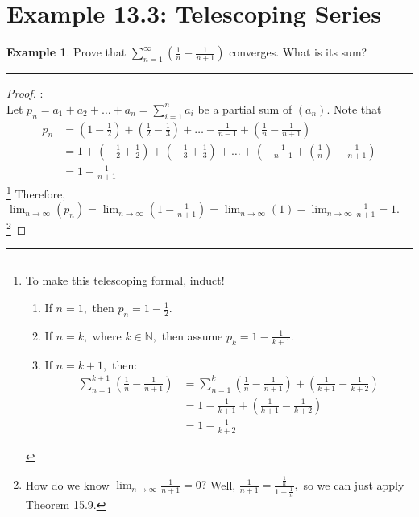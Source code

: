 \documentclass[openany, amssymb, psamsfonts]{amsart}
\newcommand{\bbN}{\mathbb{N}}
\theoremstyle{definition}
\newtheorem{exmp}{Example}[section]
\numberwithin{equation}{section}
\begin{document}
\section*{Example 13.3: Telescoping Series}
\begin{exmp}
\label{16.3}
	Prove that $\displaystyle \sum\limits_{n = 1}^{\infty} \left(\frac{1}{n} - \frac{1}{n + 1}\right)$ converges. What is its sum?
\end{exmp}
\vspace{4pt}     \hrule   \vspace{4pt} \begin{proof}:\\
Let $p_n = a_1 + a_2 + \dots + a_n = \sum_{i=1}^na_i$ be a partial sum of $(a_n).$ Note that 
\begin{align*}
p_n &= (1 - \frac{1}{2}) + (\frac{1}{2} - \frac{1}{3}) + \dots - \frac{1}{n-1}+(\frac{1}{n} - \frac{1}{n+1})\\
&= 1 + (-\frac{1}{2} + \frac{1}{2}) + (-\frac{1}{3} + \frac{1}{3}) + \dots  + (-\frac{1}{n-1}+(\frac{1}{n}) - \frac{1}{n+1})\\
&= 1 - \frac{1}{n+1}
\end{align*}\footnote{To make this telescoping formal, induct!
\begin{enumerate}
\item If $n = 1,$ then $p_n = 1 - \frac{1}{2}.$
\item If $n = k,$ where $k\in \bbN,$ then assume $p_k = 1 - \frac{1}{k+1}.$
\item If $n = k+1,$ then:
\begin{align*}
\displaystyle\sum_{n = 1}^{k+1} (\frac{1}{n} - \frac{1}{n+1})&= \displaystyle\sum_{n=1}^k(\frac{1}{n} - \frac{1}{n+1}) + (\frac{1}{k+1} - \frac{1}{k+2})\\
\tag{Ind. Hypothesis}&=  1 - \frac{1}{k+1} + (\frac{1}{k+1} - \frac{1}{k+2})\\
&= 1 - \frac{1}{k+2}
\end{align*}
\end{enumerate}
} Therefore, $\displaystyle\lim_{n\to \infty}(p_n) = \displaystyle\lim_{n\to \infty}(1-\frac{1}{n+1}) = \displaystyle\lim_{n\to \infty}(1) - \displaystyle\lim_{n\to \infty}\frac{1}{n+1} = 1.$ \footnote{How do we know $\displaystyle\lim_{n\to \infty}\frac{1}{n+1} = 0?$ Well, $\frac{1}{n+1} = \frac{\frac{1}{n}}{1 + \frac{1}{n}},$ so we can just apply Theorem 15.9.}
\end{proof}\vspace{4pt}     \hrule   \vspace{4pt}
\newpage
\end{document}
